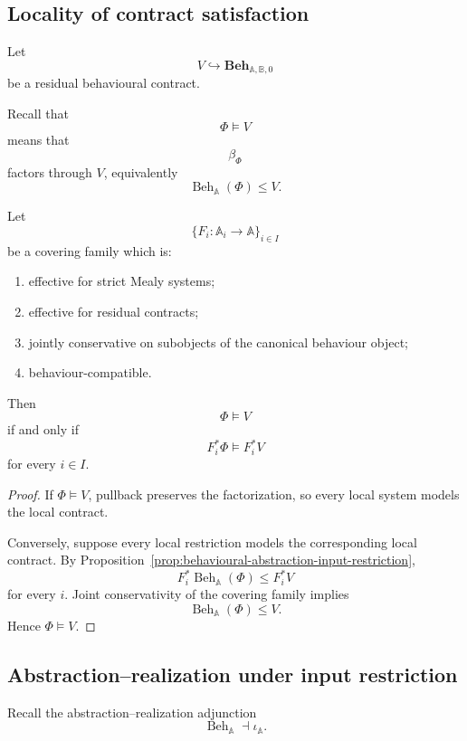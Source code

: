 \subsection{Locality of contract satisfaction}
\label{subsec:locality-contract-satisfaction}

Let
\[
    V\hookrightarrow
    \mathbf{Beh}_{\mathbb A,\mathbb B,0}
\]
be a residual behavioural contract.

Recall that
\[
    \Phi\models V
\]
means that
\[
    \beta_\Phi
\]
factors through \(V\), equivalently
\[
    \operatorname{Beh}_{\mathbb A}(\Phi)\leq V.
\]

\begin{theorem}
\label{thm:locality-contract-satisfaction}
Let
\[
    \{F_i:\mathbb A_i\to\mathbb A\}_{i\in I}
\]
be a covering family which is:
\begin{enumerate}
    \item effective for strict Mealy systems;
    \item effective for residual contracts;
    \item jointly conservative on subobjects of the canonical behaviour
    object;
    \item behaviour-compatible.
\end{enumerate}
Then
\[
    \Phi\models V
\]
if and only if
\[
    F_i^\ast\Phi
    \models
    F_i^\ast V
\]
for every \(i\in I\).
\end{theorem}

\begin{proof}
If \(\Phi\models V\), pullback preserves the factorization, so every local
system models the local contract.

Conversely, suppose every local restriction models the corresponding local
contract. By
Proposition~\ref{prop:behavioural-abstraction-input-restriction},
\[
    F_i^\ast
    \operatorname{Beh}_{\mathbb A}(\Phi)
    \leq
    F_i^\ast V
\]
for every \(i\). Joint conservativity of the covering family implies
\[
    \operatorname{Beh}_{\mathbb A}(\Phi)\leq V.
\]
Hence \(\Phi\models V\).
\end{proof}

\subsection{Abstraction--realization under input restriction}
\label{subsec:abstraction-realization-input-restriction}

Recall the abstraction--realization adjunction
\[
    \operatorname{Beh}_{\mathbb A}
    \dashv
    \iota_{\mathbb A}.
\]

